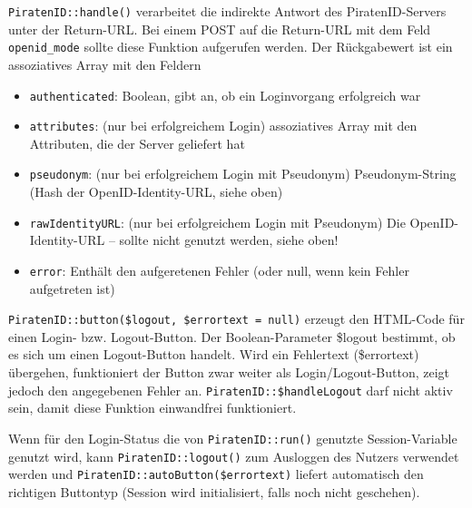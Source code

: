 \texttt{PiratenID::handle()} verarbeitet die indirekte Antwort des PiratenID-Servers unter der Return-URL.
Bei einem POST auf die Return-URL mit dem Feld \texttt{openid\_mode} sollte diese Funktion aufgerufen werden.
Der Rückgabewert ist ein assoziatives Array mit den Feldern 
\begin{itemize}
	\item \texttt{authenticated}: Boolean, gibt an, ob ein Loginvorgang erfolgreich war
	\item \texttt{attributes}: (nur bei erfolgreichem Login) assoziatives Array mit den Attributen, die der Server geliefert hat
	\item \texttt{pseudonym}: (nur bei erfolgreichem Login mit Pseudonym) Pseudonym-String (Hash der OpenID-Identity-URL, siehe oben)
	\item \texttt{rawIdentityURL}: (nur bei erfolgreichem Login mit Pseudonym) Die OpenID-Identity-URL -- sollte nicht genutzt werden, siehe oben!
	\item \texttt{error}: Enthält den aufgeretenen Fehler (oder null, wenn kein Fehler aufgetreten ist)
\end{itemize}

\texttt{PiratenID::button(\$logout, \$errortext = null)} erzeugt den HTML-Code für einen Login- bzw. Logout-Button.
Der Boolean-Parameter \$logout bestimmt, ob es sich um einen Logout-Button handelt.
Wird ein Fehlertext (\$errortext) übergehen, funktioniert der Button zwar weiter als Login/Logout-Button,
zeigt jedoch den angegebenen Fehler an.
\texttt{PiratenID::\$handleLogout} darf nicht aktiv sein, damit diese Funktion einwandfrei funktioniert.

Wenn für den Login-Status die von \texttt{PiratenID::run()} genutzte Session-Variable genutzt wird,
kann \texttt{PiratenID::logout()} zum Ausloggen des Nutzers verwendet werden und
\texttt{PiratenID::autoButton(\$errortext)} liefert automatisch den richtigen Buttontyp
(Session wird initialisiert, falls noch nicht geschehen).
